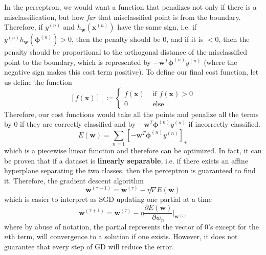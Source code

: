 \documentclass{article}
\theoremstyle{definition}
\theoremstyle{remark}
\theoremstyle{definition}
\begin{document}
In the perceptron, we would want a function that penalizes not only if there is a misclassification, but how \textit{far} that misclassified point is from the boundary. Therefore, if $y^{(n)}$ and $h_\mathbf{w} (\mathbf{x}^{(n)})$ have the same sign, i.e. if $y^{(n)} h_\mathbf{w} (\boldsymbol{\phi}^{(n)}) > 0$, then the penalty should be $0$, and if it is $< 0$, then the penalty should be proportional to the orthogonal distance of the misclassified point to the boundary, which is represented by $-\mathbf{w}^T \boldsymbol{\phi}^{(n)} y^{(n)}$ (where the negative sign makes this cost term positive). To define our final cost function, let us define the function 
\[[f(\mathbf{x})]_+ \coloneqq \begin{cases} f(\mathbf{x}) & \text{ if } f(\mathbf{x}) > 0 \\ 0 & \text{ else } \end{cases}\]
Therefore, our cost functions would take all the points and penalize all the terms by $0$ if they are correctly classified and by $-\mathbf{w}^T \boldsymbol{\phi}^{(n)} y^{(n)}$ if incorrectly classified. 
\[E(\mathbf{w}) = \sum_{n=1} [ -\mathbf{w}^T \boldsymbol{\phi}^{(n)} y^{(n)} ]_+\]
which is a piecewise linear function and therefore can be optimized. In fact, it can be proven that if a dataset is \textbf{linearly separable}, i.e. if there exists an affine hyperplane separating the two classes, then the perceptron is guaranteed to find it. Therefore, the gradient descent algorithm
\[\mathbf{w}^{(\tau + 1)} = \mathbf{w}^{(\tau)} - \eta \nabla E(\mathbf{w})\]
which is easier to interpret as SGD updating one partial at a time
\[\mathbf{w}^{(\tau + 1)} = \mathbf{w}^{(\tau)} - \eta \frac{\partial E(\mathbf{w})}{\partial w_n} \bigg|_{\mathbf{w}^{(\tau)}}\]
where by abuse of notation, the partial represents the vector of $0$'s except for the $n$th term, will convergence to a solution if one exists. However, it does not guarantee that every step of GD will reduce the error. 
\end{document}
